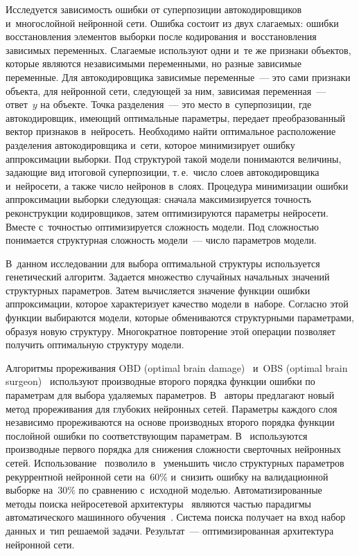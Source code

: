 \begin{multicols}{2}
Исследуется зависимость ошибки от суперпозиции 
автокодировщиков~\cite{eighteen} и~многослойной нейронной сети. Ошибка 
состоит из двух слагаемых: ошибки восстановления элементов выборки после 
кодирования и~восстановления зависимых переменных. Слагаемые 
используют одни и~те же признаки объектов, которые являются независимыми переменными, но 
разные зависимые переменные. Для автокодировщика зависимые переменные~--- это 
сами признаки объекта, для нейронной сети, следующей за ним, зависимая 
переменная~--- ответ~$y$ на объекте.  Точка разделения~--- это место 
в~суперпозиции, где автокодировщик, име\-ющий оптимальные параметры, передает 
преобразованный вектор признаков в~нейросеть. Необходимо найти оптимальное 
расположение разделения автокодировщика и~сети, которое минимизирует ошибку 
аппроксимации выборки. Под структурой такой модели понимаются величины, 
за\-да\-ющие вид итоговой суперпозиции,  т.\,е.\ чис\-ло слоев автокодировщика 
и~нейросети, а также число нейронов в~слоях. Процедура минимизации ошибки 
аппроксимации выборки следующая: сначала максимизируется точность 
реконструкции кодировщиков, затем оптимизируются параметры нейросети. 
Вмес\-те с~точностью оптимизируется сложность модели. Под сложностью понимается 
{структурная сложность модели}~--- число параметров модели.

В~данном исследовании для выбора оптимальной структуры используется 
генетический алгоритм. Задается множество случайных начальных значений 
структурных параметров. Затем вычисляется значение функции ошибки 
аппроксимации, которое характеризует качество модели в~наборе. Согласно этой 
функции выбираются модели, которые обмениваются структурными параметрами, 
образуя новую структуру. Многократное повторение этой операции позволяет 
получить оптимальную структуру модели. 

Алгоритмы прореживания OBD (optimal brain damage)~\cite{second} и~OBS
(optimal brain surgeon)~\cite{nine} используют 
производные второго порядка функции ошибки по параметрам для выбора удаляемых 
параметров. В~\cite{eight} авторы предлагают новый метод прореживания для 
глубоких нейронных сетей. Параметры каждого слоя независимо  прореживаются на 
основе производных второго порядка функции послойной ошибки по 
соответствующим па\-ра\-мет\-рам. В~\cite{ten} используются производные первого 
порядка для снижения слож\-ности сверточных нейронных сетей. 
Использование~\cite{second} позволило в~\cite{eleven} уменьшить чис\-ло 
структурных параметров рекуррентной нейронной сети на~$60\%$ и~снизить ошибку 
на валидационной выборке на~$30\%$ по сравнению с~исходной моделью. 
Автоматизированные методы поиска нейросетевой архитектуры~\cite{twentyone} 
являются \mbox{частью} парадигмы автоматического машинного 
обучения~\cite{twentytwo}. Сис\-те\-ма поиска получает на вход набор данных и~тип 
решаемой задачи. Результат~--- оптимизированная архитектура нейронной сети.


\end{multicols}
